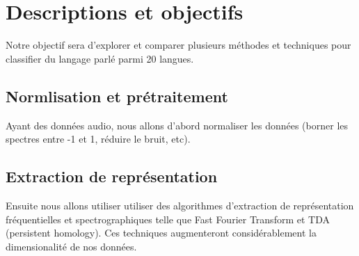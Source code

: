 \documentclass{article}
\begin{document}
\begin{comment}
\section{Contributions de chaque membre de l'équipe}
Chaque membre de l'équipe se chargera de faire les trois pipelines (1.1, 1.2, 1.3) pour un jeux de données spécifiques.\\
\section{Source de données}
\subsection{}
Notre premier jeu de données est un ensemble de prononciations des catégories de MNIST. Voici le lien vers les données: \href{https://github.com/Jakobovski/free-spoken-digit-dataset/tree/master}{https://github.com/Jakobovski/free-spoken-digit-dataset/tree/master}
\subsection{}
Notre deuxième jeu de données est un ensemble de languages parlé qui est libelé avec la langue qui est parlé dans l'extrait sonore. Voici le lien vers les données: \href{https://huggingface.co/datasets/common_language}{https://huggingface.co/datasets/common_language}
\subsection{}
Notre troisième jeu de données est un ensemble de données musicales qui est libelé avec le genre de musique. Voici le lien vers les données: \href{https://huggingface.co/datasets/marsyas/gtzan}{https://huggingface.co/datasets/marsyas/gtzan}
\end{comment}
\section*{Descriptions et objectifs}
Notre objectif sera d'explorer et comparer plusieurs méthodes et techniques pour classifier du langage parlé parmi 20 langues. 
\subsection*{Normlisation et prétraitement}
Ayant des données audio, nous allons d'abord normaliser les données (borner les spectres entre -1 et 1, réduire le bruit, etc). 
\subsection*{Extraction de représentation}Ensuite nous allons utiliser utiliser des algorithmes d'extraction de représentation fréquentielles et spectrographiques telle que Fast Fourier Transform et TDA (persistent homology). Ces techniques augmenteront considérablement la dimensionalité de nos données. 
\end{document}
